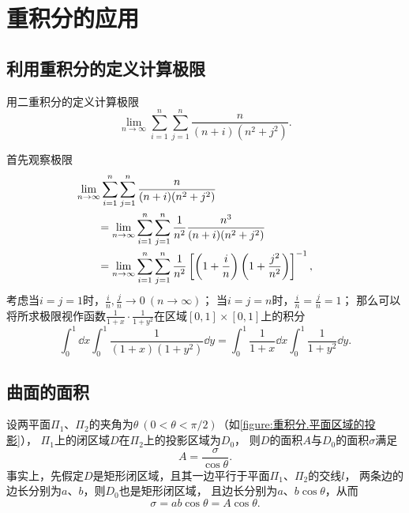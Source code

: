 \section{重积分的应用}
\subsection{利用重积分的定义计算极限}
\begin{example}
用二重积分的定义计算极限\[
\lim\limits_{n\to\infty} \sum\limits_{i=1}^n \sum\limits_{j=1}^n \frac{n}{(n+i)(n^2+j^2)}.
\]
\begin{solution}
首先观察极限
\begin{align*}
&\hspace{-20pt}
\lim\limits_{n\to\infty} \sum\limits_{i=1}^n \sum\limits_{j=1}^n \frac{n}{(n+i)(n^2+j^2)} \\
&= \lim\limits_{n\to\infty} \sum\limits_{i=1}^n \sum\limits_{j=1}^n \frac{1}{n^2} \frac{n^3}{(n+i)(n^2+j^2)} \\
&= \lim\limits_{n\to\infty} \sum\limits_{i=1}^n \sum\limits_{j=1}^n \frac{1}{n^2} \left[\left(1+\frac{i}{n}\right)\left(1+\frac{j^2}{n^2}\right)\right]^{-1},
\end{align*}
考虑当\(i=j=1\)时，\(\frac{i}{n},\frac{j}{n}\to0\ (n\to\infty)\)；
当\(i=j=n\)时，\(\frac{i}{n}=\frac{j}{n}=1\)；
那么可以将所求极限视作函数\(\frac{1}{1+x}\cdot\frac{1}{1+y^2}\)在区域\([0,1]\times[0,1]\)上的积分\[
\int_0^1 \dd{x} \int_0^1 \frac{1}{(1+x)(1+y^2)} \dd{y}
= \int_0^1 \frac{1}{1+x} \dd{x} \int_0^1 \frac{1}{1+y^2} \dd{y}.
\]
\end{solution}
\end{example}

\subsection{曲面的面积}
设两平面\(\Pi_1\)、\(\Pi_2\)的夹角为\(\theta\ (0<\theta<\pi/2)\)（如\cref{figure:重积分.平面区域的投影}），%
\(\Pi_1\)上的闭区域\(D\)在\(\Pi_2\)上的投影区域为\(D_0\)，%
则\(D\)的面积\(A\)与\(D_0\)的面积\(\sigma\)满足\[
A = \frac{\sigma}{\cos\theta}.
\]
事实上，先假定\(D\)是矩形闭区域，且其一边平行于平面\(\Pi_1\)、\(\Pi_2\)的交线\(l\)，%
两条边的边长分别为\(a\)、\(b\)，则\(D_0\)也是矩形闭区域，%
且边长分别为\(a\)、\(b \cos\theta\)，从而\[
\sigma = ab\cos\theta = A \cos\theta.
\]

